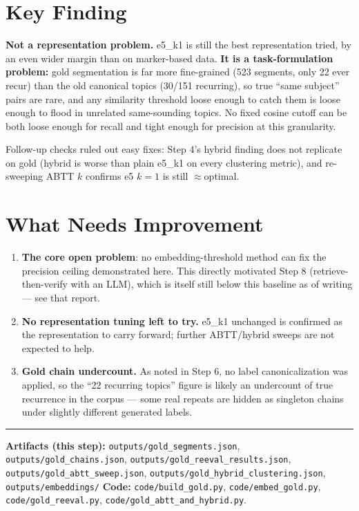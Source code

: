 \documentclass[11pt,a4paper]{article}
\begin{document}
\section{Key Finding}

\textbf{Not a representation problem.} e5\_k1 is still the best representation tried, by an even
wider margin than on marker-based data. \textbf{It is a task-formulation problem:} gold
segmentation is far more fine-grained (523 segments, only 22 ever recur) than the old canonical
topics (30/151 recurring), so true ``same subject'' pairs are rare, and any similarity threshold
loose enough to catch them is loose enough to flood in unrelated same-sounding topics. No fixed
cosine cutoff can be both loose enough for recall and tight enough for precision at this
granularity.

Follow-up checks ruled out easy fixes: Step 4's hybrid finding does not replicate on gold
(hybrid is worse than plain e5\_k1 on every clustering metric), and re-sweeping ABTT $k$
confirms e5 $k{=}1$ is still $\approx$optimal.

\section{What Needs Improvement}

\begin{enumerate}[leftmargin=1.4em]
  \item \textbf{The core open problem}: no embedding-threshold method can fix the precision
        ceiling demonstrated here. This directly motivated Step 8 (retrieve-then-verify with
        an LLM), which is itself still below this baseline as of writing --- see that report.
  \item \textbf{No representation tuning left to try.} e5\_k1 unchanged is confirmed as the
        representation to carry forward; further ABTT/hybrid sweeps are not expected to help.
  \item \textbf{Gold chain undercount.} As noted in Step 6, no label canonicalization was
        applied, so the ``22 recurring topics'' figure is likely an undercount of true
        recurrence in the corpus --- some real repeats are hidden as singleton chains under
        slightly different generated labels.
\end{enumerate}

\vspace{1.5em}
\hrule
\vspace{0.4em}
\raggedright
{\small
\textbf{Artifacts (this step):} \newline
\texttt{outputs/gold\_segments.json}, \texttt{outputs/gold\_chains.json}, \newline
\texttt{outputs/gold\_reeval\_results.json}, \texttt{outputs/gold\_abtt\_sweep.json}, \newline
\texttt{outputs/gold\_hybrid\_clustering.json}, \texttt{outputs/embeddings/} \newline
\textbf{Code:} \texttt{code/build\_gold.py}, \texttt{code/embed\_gold.py},
\texttt{code/gold\_reeval.py}, \texttt{code/gold\_abtt\_and\_hybrid.py}.
}
\end{document}
